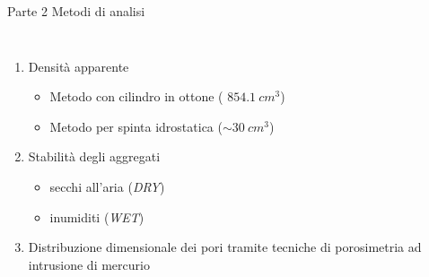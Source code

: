 \documentclass[10pt]{beamer}
\begin{document}
\begin{frame}{Parte 2 \small{Metodi di analisi}}
  \begin{columns}[c]
    \begin{enumerate}[<+->]
    \item Densit\`a apparente
      \begin{itemize}
      \item Metodo con cilindro in ottone ( $ 854.1\: cm^3$)
        \pause
      \item Metodo per spinta idrostatica ($\sim 30 \: cm^3$)
        \pause
      \end{itemize}
    \item Stabilit\`a degli aggregati
      \begin{itemize}
      \item secchi all'aria (\emph{DRY})
      \item inumiditi (\emph{WET})
      \end{itemize}
      \pause
    \item Distribuzione dimensionale dei pori tramite tecniche di
      porosimetria ad intrusione di mercurio      
    \end{enumerate}

\end{columns}
\end{frame}
\end{document}
